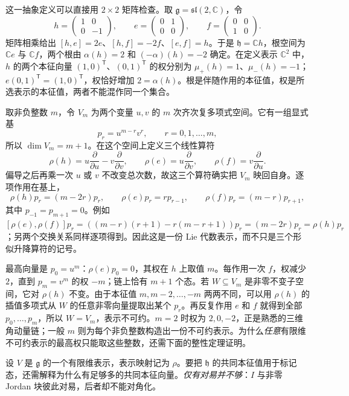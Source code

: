 这一抽象定义可以直接用 $2\times2$ 矩阵检查。取 $\mathfrak g=\mathfrak{sl}(2,\mathbb C)$，令
\[
h=\begin{pmatrix}1&0\\0&-1\end{pmatrix},\qquad
e=\begin{pmatrix}0&1\\0&0\end{pmatrix},\qquad
f=\begin{pmatrix}0&0\\1&0\end{pmatrix}.
\]
矩阵相乘给出 $[h,e]=2e$、$[h,f]=-2f$、$[e,f]=h$。于是 $\mathfrak h=\mathbb Ch$，根空间为 $\mathbb Ce$ 与 $\mathbb Cf$，两个根由 $\alpha(h)=2$ 和 $(-\alpha)(h)=-2$ 确定。在定义表示 $\mathbb C^2$ 中，$h$ 的两个本征向量 $(1,0)^{\mathsf T}$、$(0,1)^{\mathsf T}$ 的权分别为 $\mu_+(h)=1$、$\mu_-(h)=-1$；$e(0,1)^{\mathsf T}=(1,0)^{\mathsf T}$，权恰好增加 $2=\alpha(h)$。根是伴随作用的本征值，权是所选表示的本征值，两者不能混作同一个集合。

\begin{example}[在多项式上看见完整的权链]
取非负整数 $m$，令 $V_m$ 为两个变量 $u,v$ 的 $m$ 次齐次复多项式空间。它有一组显式基
\[
p_r=u^{m-r}v^r,\qquad r=0,1,\ldots,m,
\]
所以 $\dim V_m=m+1$。在这个空间上定义三个线性算符
\[
\rho(h)=u\frac{\partial}{\partial u}-v\frac{\partial}{\partial v},
\qquad
\rho(e)=u\frac{\partial}{\partial v},
\qquad
\rho(f)=v\frac{\partial}{\partial u}.
\]
偏导之后再乘一次 $u$ 或 $v$ 不改变总次数，故这三个算符确实把 $V_m$ 映回自身。逐项作用在基上，
\[
\rho(h)p_r=(m-2r)p_r,\qquad
\rho(e)p_r=r p_{r-1},\qquad
\rho(f)p_r=(m-r)p_{r+1},
\]
其中 $p_{-1}=p_{m+1}=0$。例如
$[\rho(e),\rho(f)]p_r=((m-r)(r+1)-r(m-r+1))p_r=(m-2r)p_r=\rho(h)p_r$；另两个交换关系同样逐项得到。因此这是一份 Lie 代数表示，而不只是三个形似升降算符的记号。

最高向量是 $p_0=u^m$：$\rho(e)p_0=0$，其权在 $h$ 上取值 $m$。每作用一次 $f$，权减少 $2$，直到 $p_m=v^m$ 的权 $-m$；链上恰有 $m+1$ 个态。若 $W\subseteq V_m$ 是非零不变子空间，它对 $\rho(h)$ 不变。由于本征值 $m,m-2,\ldots,-m$ 两两不同，可以用 $\rho(h)$ 的插值多项式从 $W$ 的任意非零向量提取出某个 $p_r$。再反复作用 $e$ 和 $f$ 就得到全部 $p_0,\ldots,p_m$，所以 $W=V_m$，表示不可约。$m=2$ 时权为 $2,0,-2$，正是熟悉的三维角动量链；一般 $m$ 则为每个非负整数构造出一份不可约表示。为什么\emph{任意}有限维不可约表示的最高权只能取这些整数，还需下面的整性定理证明。
\end{example}

设 $V$ 是 $\mathfrak g$ 的一个有限维表示，表示映射记为 $\rho$。要把 $\mathfrak h$ 的共同本征值用于标记态，还需解释为什么有足够多的共同本征向量。\emph{仅有对易并不够}：$I$ 与非零 Jordan 块彼此对易，后者却不能对角化。

